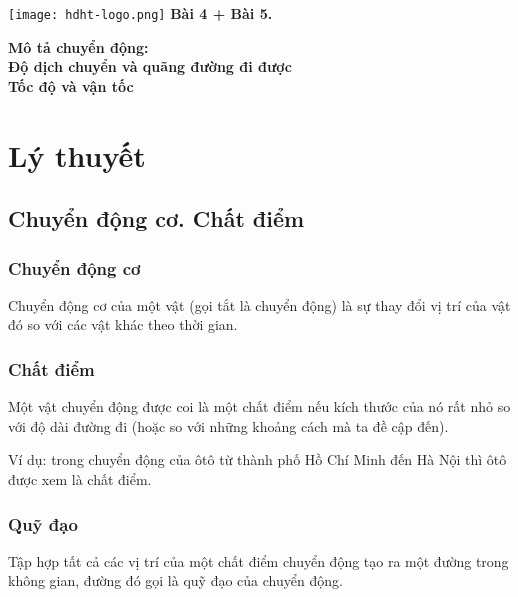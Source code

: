 \newcommand{\chapter}[2][]{
	\newcommand{\chapname}{#2}
	\begin{flushleft}
		\begin{minipage}[t]{\linewidth}
			\texttt{[image: hdht-logo.png]}
			\hspace{0pt}	
			\sffamily\bfseries\large Bài  4 + Bài 5.
			\begin{flushleft}
				\LARGE\bfseries #1
			\end{flushleft}
		\end{minipage}
	\end{flushleft}
	\vspace{1cm}
	\normalfont\normalsize
}
\chapter[Mô tả chuyển động:\\Độ dịch chuyển và quãng đường đi được \\Tốc độ và vận tốc]{Mô tả chuyển động: \\Độ dịch chuyển và quãng đường đi được \\ Tốc độ và vận tốc}
\section{Lý thuyết}
\subsection{Chuyển động cơ. Chất điểm}
\subsubsection{Chuyển động cơ}
Chuyển động cơ của một vật (gọi tắt là chuyển động) là sự thay đổi vị trí của vật đó so với các vật khác theo thời gian.
\subsubsection{Chất điểm}
Một vật chuyển động được coi là một chất điểm nếu kích thước của nó rất nhỏ so với độ dài đường đi (hoặc so với những khoảng cách mà ta đề cập đến).

Ví dụ: trong chuyển động của ôtô từ thành phố Hồ Chí Minh đến Hà Nội thì ôtô được xem là chất điểm.
\subsubsection{Quỹ đạo}
Tập hợp tất cả các vị trí của một chất điểm chuyển động tạo ra một đường trong không gian, đường đó gọi là quỹ đạo của chuyển động.
